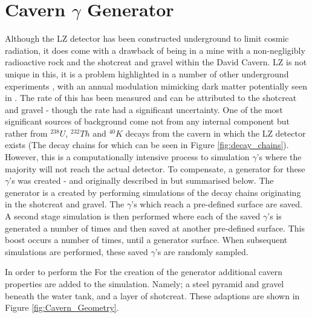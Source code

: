 \section{Cavern $\gamma$ Generator}
\label{sec:cavern_gamma_generator}

\par
Although the LZ detector has been constructed underground to limit cosmic radiation, it does come with a drawback of being in a mine with a non-negligibly radioactive rock and the shotcreat and gravel within the David Cavern.
LZ is not unique in this, it is a problem highlighted in a number of other underground experiments \cite{cavern_gamma_annual_modulation_CoGeNT_ref, cavern_gammas_in_Soudan_mine_ref}, with an annual modulation mimicking dark matter potentially seen in \cite{cavern_gamma_annual_modulation_CoGeNT_ref}.
The rate of this has been measured and can be attributed to the shotcreat and gravel \cite{LZ_Gamma_Ray_Background_ref} - though the rate had a significant uncertainty.
One of the most significant sources of background come not from any internal component but rather from $^{238}U$, $^{232}Th$ and $^{40}K$ decays from the cavern in which the LZ detector exists (The decay chains for which can be seen in Figure \ref{fig:decay_chains}).
However, this is a computationally intensive process to simulation $\gamma$'s where the majority will not reach the actual detector.
To compensate, a generator for these $\gamma$'s was created - and originally described in \cite{rg_generator_ref} but summarised below.
The generator is a created by performing simulations of the decay chains originating in the shotcreat and gravel.
The $\gamma$'s which reach a pre-defined surface are saved.
A second stage simulation is then performed where each of the saved $\gamma$'s is generated a number of times and then saved at another pre-defined surface.
This boost occurs a number of times, until a generator surface.
When subsequent simulations are performed, these saved $\gamma$'s are randomly sampled. 

\par
In order to perform the For the creation of the generator additional cavern properties are added to the simulation.
Namely; a steel pyramid and gravel beneath the water tank, and a layer of shotcreat.
These adaptions are shown in Figure \ref{fig:Cavern_Geometry}.


